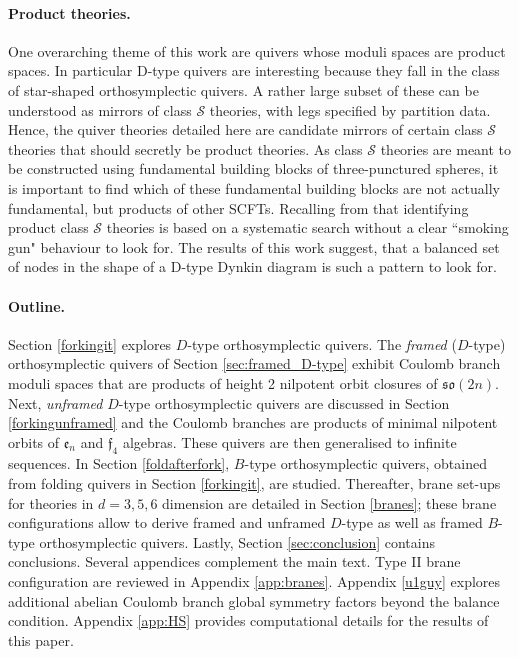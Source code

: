 \documentclass[a4paper,11pt]{article}
\begin{document}
\paragraph{Product theories.}
One overarching theme of this work are quivers whose moduli spaces are product spaces. In particular D-type quivers are interesting because they fall in the class of star-shaped orthosymplectic quivers. A rather large subset of these can be understood as mirrors of class $\mathcal{S}$ theories, with legs specified by partition data. Hence, the quiver theories detailed here are candidate mirrors of certain class $\mathcal{S}$ theories that should secretly be product theories. As class $\mathcal{S}$ theories are meant to be constructed using fundamental building blocks of three-punctured spheres, it is important to find which of these fundamental building blocks are not actually fundamental, but products of other SCFTs. Recalling from \cite{Distler:2017xba,Distler:2018gbc} that identifying product class $\mathcal{S}$ theories is based on a systematic search without a clear ``smoking gun" behaviour to look for. The results of this work suggest, that a balanced set of nodes in the shape of a D-type Dynkin diagram is such a pattern to look for.



\paragraph{Outline.} Section \ref{forkingit} explores $D$-type orthosymplectic quivers. 
 The \emph{framed} ($D$-type) orthosymplectic quivers  of Section \ref{sec:framed_D-type} exhibit Coulomb branch moduli spaces that are products of height 2 nilpotent orbit closures of $\mathfrak{so}(2n)$. Next, \emph{unframed} $D$-type orthosymplectic quivers are discussed in Section \ref{forkingunframed} and the Coulomb branches are products of minimal nilpotent orbits of $\mathfrak{e}_n$ and $\mathfrak{f}_4$ algebras. These quivers are then generalised to infinite sequences. In Section \ref{foldafterfork}, $B$-type orthosymplectic quivers, obtained from folding quivers in Section \ref{forkingit}, are studied. Thereafter, brane set-ups for theories in $d=3,5,6$ dimension are detailed in Section \ref{branes}; these brane configurations allow to derive framed and unframed  $D$-type as well as framed $B$-type orthosymplectic quivers. Lastly, Section \ref{sec:conclusion} contains conclusions. 
Several appendices complement the main text. Type II brane configuration are reviewed in Appendix \ref{app:branes}. Appendix \ref{u1guy} explores additional abelian Coulomb branch global symmetry factors beyond the balance condition. Appendix \ref{app:HS} provides computational details for the results of this paper.
\end{document}
